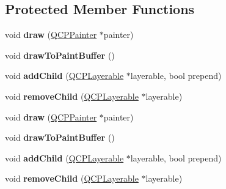 \subsection*{Protected Member Functions}
\begin{DoxyCompactItemize}
\item 
\mbox{\label{class_q_c_p_layer_ab831a99c8d30b15ec4533ca341e8813b}} 
void {\bfseries draw} (\hyperlink{class_q_c_p_painter}{Q\+C\+P\+Painter} $\ast$painter)
\item 
\mbox{\label{class_q_c_p_layer_a4a8e0a86f31462299e7fc8e8158dd2c6}} 
void {\bfseries draw\+To\+Paint\+Buffer} ()
\item 
\mbox{\label{class_q_c_p_layer_a57ce5e49364aa9122276d5df3b4a0ddc}} 
void {\bfseries add\+Child} (\hyperlink{class_q_c_p_layerable}{Q\+C\+P\+Layerable} $\ast$layerable, bool prepend)
\item 
\mbox{\label{class_q_c_p_layer_ac2f64ac7761650582d968d86670ef362}} 
void {\bfseries remove\+Child} (\hyperlink{class_q_c_p_layerable}{Q\+C\+P\+Layerable} $\ast$layerable)
\item 
\mbox{\label{class_q_c_p_layer_ab831a99c8d30b15ec4533ca341e8813b}} 
void {\bfseries draw} (\hyperlink{class_q_c_p_painter}{Q\+C\+P\+Painter} $\ast$painter)
\item 
\mbox{\label{class_q_c_p_layer_a4a8e0a86f31462299e7fc8e8158dd2c6}} 
void {\bfseries draw\+To\+Paint\+Buffer} ()
\item 
\mbox{\label{class_q_c_p_layer_a57ce5e49364aa9122276d5df3b4a0ddc}} 
void {\bfseries add\+Child} (\hyperlink{class_q_c_p_layerable}{Q\+C\+P\+Layerable} $\ast$layerable, bool prepend)
\item 
\mbox{\label{class_q_c_p_layer_ac2f64ac7761650582d968d86670ef362}} 
void {\bfseries remove\+Child} (\hyperlink{class_q_c_p_layerable}{Q\+C\+P\+Layerable} $\ast$layerable)
\end{DoxyCompactItemize}

